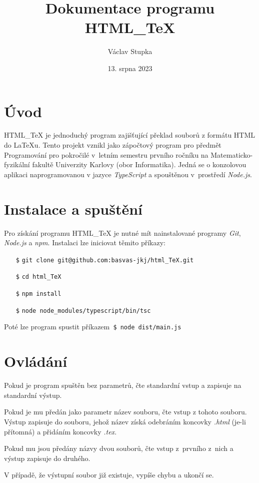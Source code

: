 \documentclass[a4paper,12pt]{article}
\title{Dokumentace programu HTML\_TeX}
\author{Václav Stupka}
\date{13. srpna 2023}
\begin{document}
	\maketitle
	\tableofcontents
	\pagebreak
	
	\section{Úvod}
	HTML\_TeX je jednoduchý program zajišťující překlad souborů z formátu HTML do LaTeXu.
	Tento projekt vznikl jako zápočtový program	pro předmět Programování pro pokročilé v~letním semestru prvního ročníku na Matema\-ticko-fyzikální fakultě Univerzity Karlovy (obor Informatika).
	Jedná se o konzolovou aplikaci naprogramovanou v jazyce \textit{TypeScript} a spouštěnou v~pro\-středí
	\textit{Node.js}.
	
	\section{Instalace a spuštění}
	Pro získání programu HTML\_TeX je nutné mít nainstalované programy \textit{Git}, \textit{Node.js} a \textit{npm}. Instalaci lze iniciovat těmito příkazy:
	\begin{itemize}
		\item[\texttt{\$}] \texttt{git clone git@github.com:basvas-jkj/html\_TeX.git}
		\item[\texttt{\$}] \texttt{cd html\_TeX}
		\item[\texttt{\$}] \texttt{npm install}
		\item[\texttt{\$}] \texttt{node node\_modules/typescript/bin/tsc}
	\end{itemize} 
	Poté lze program spustit příkazem\texttt{ \$ node dist/main.js}
	
	\section{Ovládání}
	Pokud je program spuštěn bez parametrů, čte standardní vstup a zapisuje na standardní výstup.
	
	Pokud je mu předán jako parametr název souboru, čte vstup z tohoto souboru. Výstup zapisuje do souboru, jehož název získá odebráním koncovky \textit{.html} (je-li přítomná) a přidáním koncovky \textit{.tex}.
	
	Pokud mu jsou předány názvy dvou souborů, čte vstup z~prvního z~nich a výstup zapisuje do druhého. 
	
	V případě, že výstupní soubor již existuje, vypíše chybu a ukončí se.
	
\end{document}
